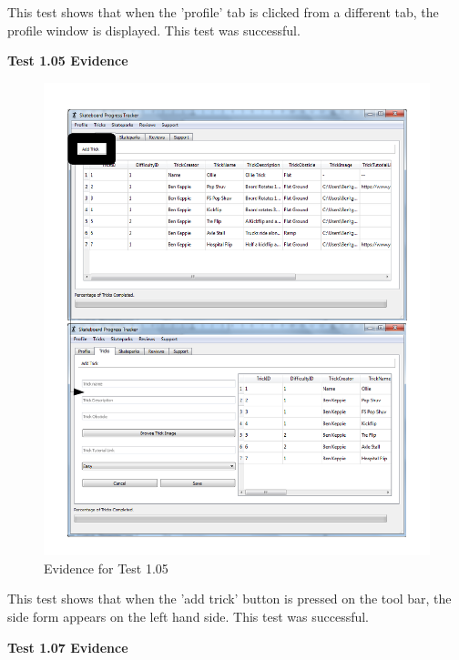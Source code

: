 This test shows that when the 'profile' tab is clicked from a different tab, the profile window is displayed. This test was successful.

\textbf{Test 1.05 Evidence}

\begin{figure}[H]
    \includegraphics[width=\textwidth]{./Testing/AnnotatedSamples/Test105.pdf}
    \caption{Evidence for Test 1.05} \label{fig:Test 1.05}
\end{figure}

This test shows that when the 'add trick' button is pressed on the tool bar, the side form appears on the left hand side. This test was successful.

\textbf{Test 1.07 Evidence}

